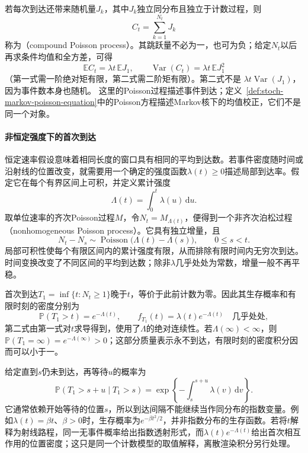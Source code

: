 若每次到达还带来随机量\(J_k\)，其中\(J_k\)独立同分布且独立于计数过程，则
\[
C_t=\sum_{k=1}^{N_t}J_k
\]
称为（compound Poisson process）。其跳跃量不必为一，也可为负；给定\(N_t\)以后再求条件均值和全方差，可得
\[
\mathbb EC_t=\lambda t\,\mathbb EJ_1,\qquad
\operatorname{Var}(C_t)=\lambda t\,\mathbb EJ_1^2
\]
（第一式需一阶绝对矩有限，第二式需二阶矩有限）。第二式不是
\(\lambda t\operatorname{Var}(J_1)\)，因为事件数本身也随机。
这里的Poisson过程描述事件到达；定义~\ref{def:stoch-markov-poisson-equation}中的Poisson方程描述Markov核下的均值校正，它们不是同一个对象。

\paragraph{非恒定强度下的首次到达}
恒定速率假设意味着相同长度的窗口具有相同的平均到达数。若事件密度随时间或沿射线的位置改变，就需要用一个确定的强度函数\(\lambda(t)\geq0\)描述局部到达率。假定它在每个有界区间上可积，并定义累计强度
\[
 \Lambda(t)=\int_0^t\lambda(u)\,\mathrm du.
\]
取单位速率的齐次Poisson过程\(M\)，令\(N_t=M_{\Lambda(t)}\)，便得到一个非齐次泊松过程（nonhomogeneous Poisson process）。它具有独立增量，且
\[
 N_t-N_s\sim\operatorname{Poisson}\bigl(\Lambda(t)-\Lambda(s)\bigr),
 \qquad 0\leq s<t.
\]
局部可积性使每个有限区间内的累计强度有限，从而排除有限时间内无穷次到达。时间变换改变了不同区间的平均到达数；除非\(\lambda\)几乎处处为常数，增量一般不再平稳。

首次到达\(T_1=\inf\{t:N_t\geq1\}\)晚于\(t\)，等价于此前计数为零。因此其生存概率和有限时刻的密度分别为
\begin{equation}
 \mathbb P(T_1>t)=e^{-\Lambda(t)},\qquad
 f_{T_1}(t)=\lambda(t)e^{-\Lambda(t)}
 \quad\text{几乎处处},
 \label{eq:stoch-nonhomogeneous-first-arrival}
\end{equation}
第二式由第一式对\(t\)求导得到，使用了\(\Lambda\)的绝对连续性。若\(\Lambda(\infty)<\infty\)，则
\(\mathbb P(T_1=\infty)=e^{-\Lambda(\infty)}>0\)；这部分质量表示永不到达，有限时刻的密度积分因而可以小于一。

给定直到\(s\)仍未到达，再等待\(u\)的概率为
\[
 \mathbb P(T_1>s+u\mid T_1>s)
 =\exp\left\{-\int_s^{s+u}\lambda(v)\,\mathrm dv\right\}.
\]
它通常依赖开始等待的位置\(s\)，所以到达间隔不能继续当作同分布的指数变量。例如\(\lambda(t)=\beta t\)、\(\beta>0\)时，生存概率为\(e^{-\beta t^2/2}\)，并非指数分布的生存函数。若将\(t\)解释为射线路程，同一无事件概率给出指数透射形式，而\(\lambda(t)e^{-\Lambda(t)}\)给出首次相互作用的位置密度；这只是同一个计数模型的取值解释，离散渲染积分另行处理。

